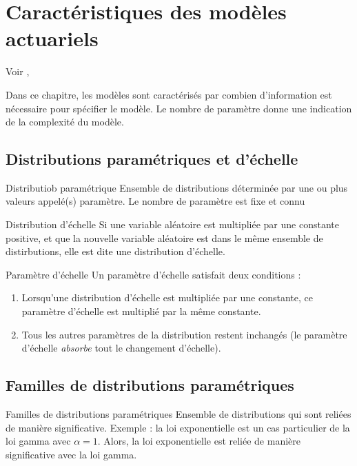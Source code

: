 \chapter{Caractéristiques des modèles actuariels}

Voir \cite{klugman2012loss}, 

Dans ce chapitre, les modèles sont caractérisés par combien d'information est nécessaire pour spécifier le modèle. Le nombre de paramètre donne une indication de la complexité du modèle. 

\section{Distributions paramétriques et d'échelle}

\begin{definition}{Distributiob paramétrique}{}
	Ensemble de distributions déterminée par une ou plus valeurs appelé(s) paramètre. Le nombre de paramètre est fixe et connu
\end{definition}

\begin{definition}{Distribution d'échelle}{}
	Si une variable aléatoire est multipliée par une constante positive, et que la nouvelle variable aléatoire est dans le même ensemble de distirbutions, elle est dite une distribution d'échelle.
\end{definition}

\begin{definition}{Paramètre d'échelle}{}
	Un paramètre d'échelle satisfait deux conditions : 
	\begin{enumerate}
		\item Lorsqu'une distribution d'échelle est multipliée par une constante, ce paramètre d'échelle est multiplié par la même constante.
		\item Tous les autres paramètres de la distribution restent inchangés (le paramètre d'échelle \textit{absorbe} tout le changement d'échelle).
	\end{enumerate}
\end{definition}

\section{Familles de distributions paramétriques}

\begin{definition}{Familles de distributions paramétriques}{}
	Ensemble de distributions qui sont reliées de manière significative. Exemple : la loi exponentielle est un cas particulier de la loi gamma avec $\alpha = 1$. Alors, la loi exponentielle est reliée de manière significative avec la loi gamma. 
\end{definition}

